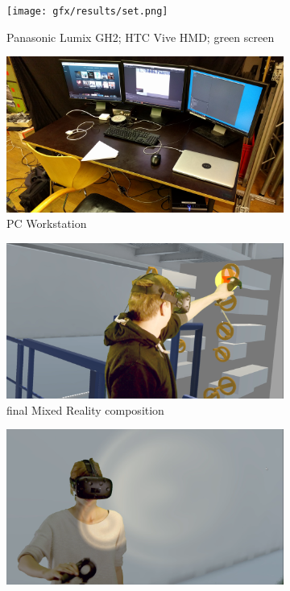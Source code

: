 \begin{figure}[htbp]
	\begin{subfigure}[t]{.49\textwidth}
		\centering
		\texttt{[image: gfx/results/set.png]}
		\caption{ Panasonic Lumix GH2;  HTC Vive HMD; 
			 green screen}
	\end{subfigure}
	\begin{subfigure}[t]{.49\textwidth}
		\centering
		\includegraphics[width=\textwidth]{gfx/results/pc.png}
		\caption{PC Workstation}
	\end{subfigure}
	\hfill
	\begin{subfigure}[t]{.49\textwidth}
		\centering
		\includegraphics[width=\textwidth]{gfx/results/mr-action_new.png}
		\caption{final Mixed Reality composition}
	\end{subfigure}
	\begin{subfigure}[t]{.49\textwidth}
		\centering
		\includegraphics[width=\textwidth]{gfx/results/self-illu.png}

\end{subfigure}
\end{figure}
